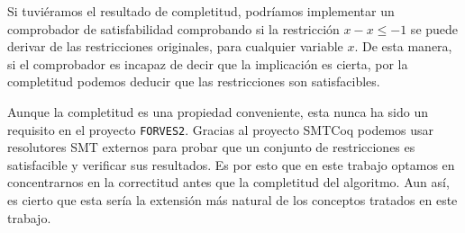 Si tuviéramos el resultado de completitud, podríamos implementar un comprobador de satisfabilidad
comprobando si la restricción $x - x \le -1$ se puede derivar de las restricciones originales, para
cualquier variable $x$. De esta manera, si el comprobador es incapaz de decir que la implicación es
cierta, por la completitud podemos deducir que las restricciones son satisfacibles.

Aunque la completitud es una propiedad conveniente, esta nunca ha sido un requisito en el proyecto
\verb|FORVES2|. Gracias al proyecto SMTCoq\cite{EMT+17} podemos usar resolutores SMT externos para
probar que un conjunto de restricciones es satisfacible y verificar sus resultados. Es por esto
que en este trabajo optamos en concentrarnos en la correctitud antes que la completitud del algoritmo.
Aun así, es cierto que esta sería la extensión más natural de los conceptos tratados en este trabajo.
